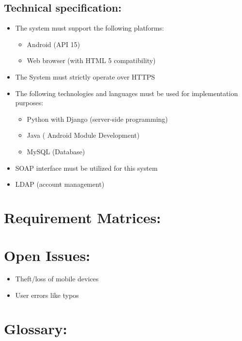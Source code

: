 \documentclass[12pt]{article}
\begin{document}
		\subsection{Technical specification:} %
		\vspace{0.1in}
		
		\begin{itemize}
			\item The system must support the following platforms: 
				\begin{itemize}
					\item Android (API 15)
					\item Web browser (with HTML 5 compatibility)
				\end{itemize}
				
			\item The System must strictly operate over HTTPS
			\item The following technologies and languages must be used for implementation purposes:
				\begin{itemize}
					\item Python with Django (server-side programming)
					\item Java ( Android Module Development)
					\item MySQL (Database)
				\end{itemize}
				\item SOAP interface must be utilized for this system
				\item LDAP (account management)
		\end{itemize}
	
	\vspace{0.5in}
	
	\newpage
	\section{Requirement Matrices:}
	\vspace{0.2in}
	
	
	
	\vspace{0.5in}
	
	\section{Open Issues:} %
	\vspace{0.2in}
	
	\begin{itemize}
		\item Theft/loss of mobile devices
		\item User errors like typos
	\end{itemize}
	
	
	\vspace{0.5in}
	
	\section{Glossary:}
	\vspace{0.2in}
		
	
	\vspace{0.5in}
		
\end{document}
